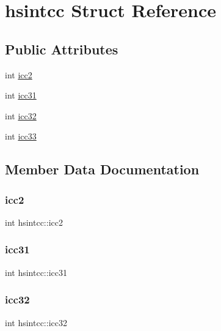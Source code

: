 \hypertarget{structhsintcc}{}\section{hsintcc Struct Reference}
\label{structhsintcc}
\subsection*{Public Attributes}
\begin{DoxyCompactItemize}
\item 
int \hyperlink{structhsintcc_aa8a20bc225680ca1fb59bb33872e7be6}{icc2}
\item 
int \hyperlink{structhsintcc_a76c6847f7045b24cb4a81ef065099e5b}{icc31}
\item 
int \hyperlink{structhsintcc_ab9582425a60813d5eb9b4601d2da85da}{icc32}
\item 
int \hyperlink{structhsintcc_a16234e4e8e5c229cbb3abbba3da47efc}{icc33}
\end{DoxyCompactItemize}


\subsection{Member Data Documentation}
\mbox{\label{structhsintcc_aa8a20bc225680ca1fb59bb33872e7be6}} 
\subsubsection{\texorpdfstring{icc2}{icc2}}
{\footnotesize\ttfamily int hsintcc\+::icc2}

\mbox{\label{structhsintcc_a76c6847f7045b24cb4a81ef065099e5b}} 
\subsubsection{\texorpdfstring{icc31}{icc31}}
{\footnotesize\ttfamily int hsintcc\+::icc31}

\mbox{\label{structhsintcc_ab9582425a60813d5eb9b4601d2da85da}} 
\subsubsection{\texorpdfstring{icc32}{icc32}}
{\footnotesize\ttfamily int hsintcc\+::icc32}

